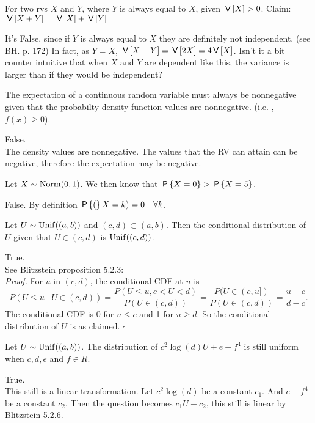 \documentclass[tf-tutorial-all.tex]{subfiles}
\begin{document}
\begin{truefalse}
For two rvs $X$ and $Y$, where $Y$ is always equal to $X$, given $\V{X}>0$. Claim: $\V{X+Y} = \V{X} + \V{Y}$
\begin{solution}
It's False, since if $Y$ is always equal to $X$ they are definitely not independent.
(see BH.
p.
172) In fact, as $Y=X$, $\V{X+Y} = \V{2X} = 4 \V X$.
Isn't it a bit counter intuitive that when $X$ and $Y$ are dependent like this, the variance is larger than if they would be independent?
\end{solution}
\end{truefalse}

\begin{truefalse}
The expectation of a continuous random variable must always be nonnegative given that the probabilty density function values are nonnegative. (i.e. , $f(x) \geq 0$).
\begin{solution}
False.\\
The density values are nonnegative. The values that the RV can attain can be negative, therefore the expectation may be negative.
\end{solution}
\end{truefalse}

\begin{truefalse}
Let $X \sim \Norm{0, 1}$. We then know that $\P{X = 0} > \P{X = 5}$.
\begin{solution}
False. By definition $\P(X = k) = 0 \quad \forall k $.
\end{solution}
\end{truefalse}

\begin{truefalse}
Let $U \sim \Unif{(a,b)}$ and  $(c,d) \subset (a,b)$. Then the conditional distribution of $U$ given that $U \in (c,d)$ is $\Unif{(c,d)}$.
\begin{solution}
True.
\\See Blitzstein proposition 5.2.3:\\
\textit{Proof.} For $u$ in $(c, d)$, the conditional CDF at $u$ is
$$
P(U \leq u \mid U \in(c, d))=\frac{P(U \leq u, c<U<d)}{P(U \in(c, d))}=\frac{P(U \in(c, u])}{P(U \in(c, d))}=\frac{u-c}{d-c} .
$$
The conditional CDF is 0 for $u \leq c$ and 1 for $u \geq d$. So the conditional distribution of $U$ is as claimed.
$\square$
\end{solution}
\end{truefalse}

\begin{truefalse}
Let $U \sim \Unif{(a,b)}$. The distribution of $c^{2} \log(d) U + e - f^{4}$ is still uniform when $c,d, e $ and $ f \in R$. \\
\begin{solution}
True.\\
This still is a linear transformation. Let $c^{2} \log(d)$ be a constant $c_{1}$. And $e - f^{4}$ be a constant $c_{2}$. Then the question becomes $c_{1} U + c_{2} $, this still is linear by Blitzstein 5.2.6.
\end{solution}
\end{truefalse}
\end{document}
